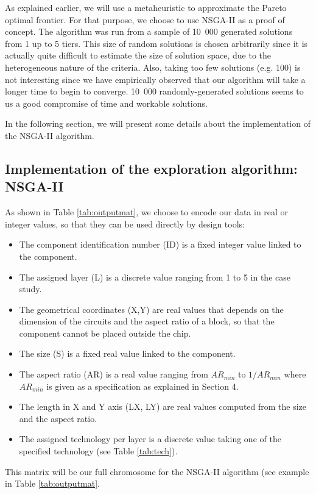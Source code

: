 As explained earlier, we will use a metaheuristic to approximate the Pareto optimal frontier. For that purpose, we choose to use NSGA-II \cite{Deb00afast} as a proof of concept. The algorithm was run from a sample of 10~000 generated solutions from 1 up to 5 tiers. This size of random solutions is chosen arbitrarily since it is actually quite difficult to estimate the size of solution space, due to the heterogeneous nature of the criteria. Also, taking too few solutions (e.g. 100) is not interesting since we have empirically observed that our algorithm will take a longer time to begin to converge. 10~000 randomly-generated solutions seems to us a good compromise of time and workable solutions.


In the following section, we will present some details about the implementation of the NSGA-II algorithm.

\subsection{Implementation of the exploration algorithm: NSGA-II}
As shown in Table \ref{tab:outputmat}, we choose to encode our data in real or integer values, so that they can be used directly by design tools:
\begin{itemize}
\item The component identification number (ID) is a fixed integer value linked to the component.
\item The assigned layer (L) is a discrete value ranging from 1 to 5 in the case study.
\item The geometrical coordinates (X,Y) are real values that depends on the dimension of the circuits and the aspect ratio of a block, so that the component cannot be placed outside the chip.
\item The size (S) is a fixed real value linked to the component.
\item The aspect ratio (AR) is a real value ranging from $AR_{min}$ to $1/AR_{min}$ where $AR_{min}$ is given as a specification as explained in Section 4.
\item The length in X and Y axis (LX, LY) are real values computed from the size and the aspect ratio.
\item The assigned technology per layer is a discrete value taking one of the specified technology (see Table \ref{tab:tech}).
\end{itemize}
This matrix will be our full chromosome for the NSGA-II algorithm (see example in Table \ref{tab:outputmat}.

